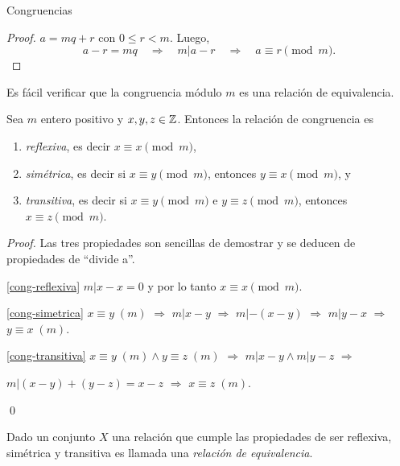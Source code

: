 \begin{section}{Congruencias}
\begin{proof}
    $a=mq+r$  con $0 \le r <m$. Luego,
    $$a-r = mq \quad \Rightarrow \quad m|a-r\quad \Rightarrow \quad a\equiv r \pmod{m}.$$ 
\end{proof}

Es fácil verificar que la {congruencia módulo} $m$ es una relación de equivalencia. 

\begin{proposicion} Sea $m$ entero positivo y $x,y,z \in {\mathbb Z}$. Entonces la relación de congruencia es
    \begin{enumerate}[label=\textit{\alph*)}]
        \item\label{cong-reflexiva}
        \textit{{reflexiva}}, es decir $x\equiv x\pmod{m}$,
        \item\label{cong-simetrica}
        \textit{{simétrica}}, es decir si $x \equiv y \pmod{m}$, entonces
        $y \equiv x \pmod{m}$, y 
        \item\label{cong-transitiva}
        \textit{{ transitiva}}, es decir si $x\equiv y \pmod{m}$ e
        $y\equiv z \pmod{m}$, entonces $x\equiv z \pmod{m}$.
        \end{enumerate}
\end{proposicion}

\begin{proof} Las tres propiedades son sencillas de demostrar y se deducen de propiedades de ``divide a''.

    \ref{cong-reflexiva}  $m| x-x =0$  y por lo tanto $x\equiv x\pmod{m}$.

    \ref{cong-simetrica} $x \equiv y\;(m)$ $\Rightarrow$ $m|x-y$ $\Rightarrow$  $m|-(x-y)$   $\Rightarrow$  $m|y-x$ $\Rightarrow$ $y \equiv x\; (m)$.

    \ref{cong-transitiva} $x \equiv y \;(m) \wedge y \equiv z \;(m)$ \;  $\Rightarrow$ \; $m|x-y \wedge m|y-z$ \; $\Rightarrow$ \; 

    \quad$m |(x-y) + (y-z) = x -z$ \; $\Rightarrow$ \; $x \equiv z \;(m)$.
    
    \qed
\end{proof}

\begin{observacion*}\label{relacion-de-equivalencia}
    Dado un conjunto $X$ una relación que cumple las propiedades de ser reflexiva, simétrica y transitiva es llamada una \textit{relación de equivalencia}.


\end{observacion*}
\end{section}
